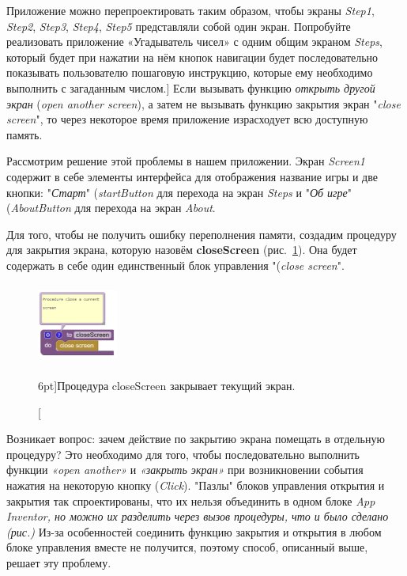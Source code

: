\begin{mdfstyle}[nobreak=true,frametitle=Упражнение]
  \sloppy
  Приложение можно перепроектировать таким образом, чтобы экраны \textit{Step1}, \textit{Step2}, \textit{Step3}, \textit{Step4}, \textit{Step5} представляли собой один экран. Попробуйте реализовать приложение «Угадыватель чисел» с одним общим экраном \textit{Steps}, который будет при нажатии на нём кнопок навигации будет последовательно показывать пользователю пошаговую инструкцию, которые ему необходимо выполнить с загаданным числом.]
  Если вызывать функцию \textit{открыть другой экран} (\textit{open another screen}), а затем не вызывать функцию закрытия экран "\textit{close screen}", то через некоторое время приложение израсходует всю доступную память.
  \end{mdfstyle}

Рассмотрим решение этой проблемы в нашем приложении. Экран \textit{Screen1} содержит в себе элементы интерфейса для отображения название игры и две кнопки: "\textit{Старт}" (\textit{startButton} для перехода на экран \textit{Steps} и "\textit{Об игре}" (\textit{AboutButton} для перехода на экран \textit{About}.

Для того, чтобы не получить ошибку переполнения памяти, создадим процедуру для закрытия экрана, которую назовём \textbf{closeScreen} (рис.~\ref{fig:block:click:close:screen}). Она будет содержать в себе один единственный блок управления "(\textit{close screen}". 
\begin{figure}
  \includegraphics[width=100,height=100]{./graphics/programs/guess_numbers/procedure_closeScreen_AppInventor_2018.png}
    \caption[Процедура closeScreen.][6pt]{Процедура closeScreen закрывает текущий экран.}
  \label{fig:block:click:close:screen}
\end{figure}
Возникает вопрос: зачем действие по закрытию экрана помещать в отдельную процедуру? Это необходимо для того, чтобы последовательно выполнить функции \textit{«open another»} и \textit{«закрыть экран»} при возникновении события нажатия на некоторую кнопку (\textit{Click}). "Пазлы" блоков управления открытия и закрытия так спроектированы, что их нельзя объединить в одном блоке \textit{App Inventor, но можно их разделить через вызов процедуры, что и было сделано (рис.)} Из-за особенностей  соединить функцию закрытия и открытия в любом блоке управления вместе не получится, поэтому способ, описанный выше, решает эту проблему.

